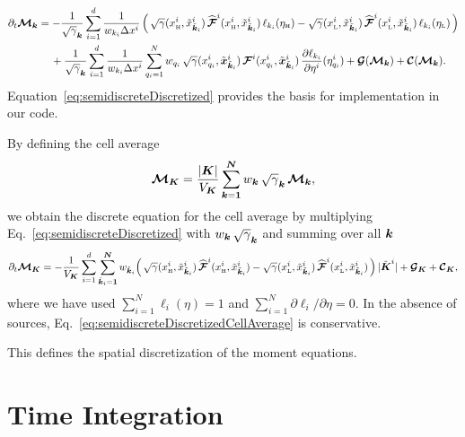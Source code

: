 \documentclass[10pt,preprint]{aastex}
\begin{document}
\begin{align}
  \partial_{t}{\boldsymbol{\mathcal{M}}_{\boldsymbol{k}}}
  &=
  -\frac{1}{\sqrt{\gamma}_{\boldsymbol{k}}}\sum_{i=1}^{d} 
  \frac{1}{w_{k_{i}}\Delta x^{i}}\,
  \Big(\,
    \sqrt{\gamma}(x_{\mbox{\tiny H}}^{i},\tilde{x}_{\tilde{\boldsymbol{k}}_{i}}^{i})\,\widehat{\boldsymbol{\mathcal{F}}}^{i}(x_{\mbox{\tiny H}}^{i},\tilde{x}_{\tilde{\boldsymbol{k}}_{i}}^{i})\,\ell_{k_{i}}(\eta_{\mbox{\tiny H}})
    -\sqrt{\gamma}(x_{\mbox{\tiny L}}^{i},\tilde{x}_{\tilde{\boldsymbol{k}}_{i}}^{i})\,\widehat{\boldsymbol{\mathcal{F}}}^{i}(x_{\mbox{\tiny L}}^{i},\tilde{x}_{\tilde{\boldsymbol{k}}_{i}}^{i})\,\ell_{k_{i}}(\eta_{\mbox{\tiny L}})
  \,\Big)
  \nonumber \\
  &\hspace{12pt}
  +\frac{1}{\sqrt{\gamma}_{\boldsymbol{k}}}\sum_{i=1}^{d}\frac{1}{w_{k_{i}}\Delta x^{i}}
  \sum_{q_{i}=1}^{N}w_{q_{i}}\,\sqrt{\gamma}(x_{q_{i}}^{i},\tilde{\boldsymbol{x}}_{\tilde{\boldsymbol{k}}_{i}}^{i})\,
  \boldsymbol{\mathcal{F}}^{i}(x_{q_{i}}^{i},\tilde{\boldsymbol{x}}_{\tilde{\boldsymbol{k}}_{i}}^{i})\,\frac{\partial \ell_{k_{i}}}{\partial \eta^{i}}(\eta_{q_{i}}^{i})
  +\boldsymbol{\mathcal{G}}(\boldsymbol{\mathcal{M}}_{\boldsymbol{k}})+\boldsymbol{\mathcal{C}}(\boldsymbol{\mathcal{M}}_{\boldsymbol{k}}).
  \label{eq:semidiscreteDiscretized}
\end{align}
Equation~\eqref{eq:semidiscreteDiscretized} provides the basis for implementation in our code.  

By defining the cell average
\begin{equation}
  \boldsymbol{\mathcal{M}}_{\boldsymbol{K}}=\frac{|\boldsymbol{K}|}{V_{\boldsymbol{K}}}\sum_{\boldsymbol{k}=\boldsymbol{1}}^{\boldsymbol{N}}w_{\boldsymbol{k}}\,\sqrt{\gamma}_{\boldsymbol{k}}\,\boldsymbol{\mathcal{M}}_{\boldsymbol{k}},
  \label{eq:conservedCellAverage}
\end{equation}
we obtain the discrete equation for the cell average by multiplying Eq.~\eqref{eq:semidiscreteDiscretized} with $w_{\boldsymbol{k}}\,\sqrt{\gamma}_{\boldsymbol{k}}$ and summing over all $\boldsymbol{k}$
\begin{equation}
  \partial_{t}{\boldsymbol{\mathcal{M}}_{\boldsymbol{K}}}
  =-\frac{1}{V_{\boldsymbol{K}}}\sum_{i=1}^{d}\sum_{\tilde{\boldsymbol{k}}_{i}=\boldsymbol{1}}^{\boldsymbol{N}}w_{\tilde{\boldsymbol{k}}_{i}}
  \Big(\,
    \sqrt{\gamma}(x_{\mbox{\tiny H}}^{i},\tilde{x}_{\tilde{\boldsymbol{k}}_{i}}^{i})\,\widehat{\boldsymbol{\mathcal{F}}}^{i}(x_{\mbox{\tiny H}}^{i},\tilde{x}_{\tilde{\boldsymbol{k}}_{i}}^{i})
    -\sqrt{\gamma}(x_{\mbox{\tiny L}}^{i},\tilde{x}_{\tilde{\boldsymbol{k}}_{i}}^{i})\,\widehat{\boldsymbol{\mathcal{F}}}^{i}(x_{\mbox{\tiny L}}^{i},\tilde{x}_{\tilde{\boldsymbol{k}}_{i}}^{i})
  \,\Big)\,|\tilde{\boldsymbol{K}}^{i}|
  +\boldsymbol{\mathcal{G}}_{\boldsymbol{K}}+\boldsymbol{\mathcal{C}}_{\boldsymbol{K}},
  \label{eq:semidiscreteDiscretizedCellAverage}
\end{equation}
where we have used $\sum_{i=1}^{N}\ell_{i}(\eta)=1$ and $\sum_{i=1}^{N}\partial\ell_{i}/\partial\eta=0$.  
In the absence of sources, Eq.~\eqref{eq:semidiscreteDiscretizedCellAverage} is conservative.  

This defines the spatial discretization of the moment equations.  

\section{Time Integration}
\end{document}
